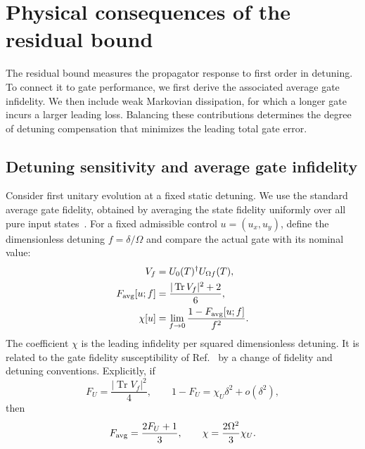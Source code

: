 \documentclass[12pt]{iopjournal}
\begin{document}
\section{Physical consequences of the residual bound}
\label{sec:dissipation}

The residual bound measures the propagator response to first order
in detuning. To connect it to gate performance, we first derive the
associated average gate infidelity. We then include weak Markovian
dissipation, for which a longer gate incurs a larger leading loss.
Balancing these contributions determines the degree of detuning
compensation that minimizes the leading total gate error.

\FloatBarrier
\subsection{Detuning sensitivity and average gate infidelity}

Consider first unitary evolution at a fixed static detuning. We use
the standard average gate fidelity, obtained by averaging the state
fidelity uniformly over all pure input
states~\cite{bowdrey2002,nielsen2002}. For a fixed admissible control
$u=(u_x,u_y)$, define the dimensionless detuning $f=\delta/\Omega$
and compare the actual gate with its nominal value:
\begin{equation}
 \begin{aligned}
 V_f&=U_0(T)^\dagger U_{\Omega f}(T),\\
 F_{\rm avg}[u;f]&=\frac{|\operatorname{Tr}V_f|^2+2}{6},\\
 \chi[u]&=\lim_{f\to0}\frac{1-F_{\rm avg}[u;f]}{f^2}.
 \end{aligned}
 \label{eq:sensitivity}
\end{equation}
The coefficient $\chi$ is the leading infidelity per squared
dimensionless detuning. It is related to the gate fidelity
susceptibility of Ref.~\cite{poggi2024} by a change of fidelity and
detuning conventions. Explicitly, if
\begin{equation*}
 F_U=\frac{|\operatorname{Tr}V_f|^2}{4},\qquad
 1-F_U=\chi_U\delta^2+o(\delta^2),
\end{equation*}
then
\begin{equation*}
 F_{\rm avg}=\frac{2F_U+1}{3},\qquad
 \chi=\frac{2\Omega^2}{3}\chi_U.
\end{equation*}
\end{document}
